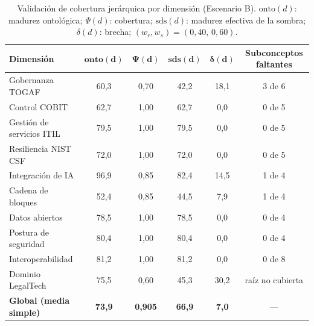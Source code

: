 \documentclass[computers,article,submit,pdftex,moreauthors]{Definitions/mdpi}
\begin{document}
\begin{table}[H]
\caption{Validación de cobertura jerárquica por dimensión (Escenario B). $\mathrm{onto}(d)$: madurez ontológica; $\Psi(d)$: cobertura; $\mathrm{sds}(d)$: madurez efectiva de la sombra; $\delta(d)$: brecha; $(w_r,w_s)=(0{,}40,\,0{,}60)$.}
\label{tab:validation}
\begin{tabularx}{\textwidth}{Xccccc}
\toprule
\textbf{Dimensión} & $\mathbf{onto(d)}$ & $\mathbf{\Psi(d)}$ & $\mathbf{sds(d)}$ & $\boldsymbol{\delta}\mathbf{(d)}$ & \textbf{Subconceptos faltantes}\\
\midrule
Gobernanza TOGAF & 60{,}3 & 0{,}70 & 42{,}2 & 18{,}1 & 3 de 6\\
Control COBIT & 62{,}7 & 1{,}00 & 62{,}7 & 0{,}0 & 0 de 5\\
Gestión de servicios ITIL & 79{,}5 & 1{,}00 & 79{,}5 & 0{,}0 & 0 de 5\\
Resiliencia NIST CSF & 72{,}0 & 1{,}00 & 72{,}0 & 0{,}0 & 0 de 5\\
Integración de IA & 96{,}9 & 0{,}85 & 82{,}4 & 14{,}5 & 1 de 4\\
Cadena de bloques & 52{,}4 & 0{,}85 & 44{,}5 & 7{,}9 & 1 de 4\\
Datos abiertos & 78{,}5 & 1{,}00 & 78{,}5 & 0{,}0 & 0 de 4\\
Postura de seguridad & 80{,}4 & 1{,}00 & 80{,}4 & 0{,}0 & 0 de 4\\
Interoperabilidad & 81{,}2 & 1{,}00 & 81{,}2 & 0{,}0 & 0 de 8\\
Dominio LegalTech & 75{,}5 & 0{,}60 & 45{,}3 & 30{,}2 & raíz no cubierta\\
\midrule
\textbf{Global (media simple)} & \textbf{73{,}9} & \textbf{0{,}905} & \textbf{66{,}9} & \textbf{7{,}0} & ---\\
\bottomrule
\end{tabularx}
\end{table}
\end{document}
